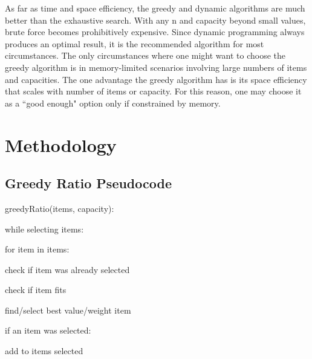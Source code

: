 \documentclass{article}
\begin{document}
As far as time and space efficiency, the greedy and dynamic algorithms are much better than the exhaustive search. With any n and capacity beyond small values, brute force becomes prohibitively expensive. Since dynamic programming always produces an optimal result, it is the recommended algorithm for most circumstances. The only circumstances where one might want to choose the greedy algorithm is in memory-limited scenarios involving large numbers of items and capacities. The one advantage the greedy algorithm has is its space efficiency that scales with number of items or capacity. For this reason, one may choose it as a ``good enough" option only if constrained by memory.

\newpage
\section{Methodology}

\subsection{Greedy Ratio Pseudocode}
\hspace{\parindent}greedyRatio(items, capacity):

\hspace{\parindent}while selecting items:

\hspace{\parindent}\hspace{\parindent}for item in items:

\hspace{\parindent}\hspace{\parindent}\hspace{\parindent}check if item was already selected

\hspace{\parindent}\hspace{\parindent}\hspace{\parindent}check if item fits

\hspace{\parindent}\hspace{\parindent}\hspace{\parindent}find/select best value/weight item

\hspace{\parindent}\hspace{\parindent}if an item was selected:

\hspace{\parindent}\hspace{\parindent}\hspace{\parindent}add to items selected
\end{document}
